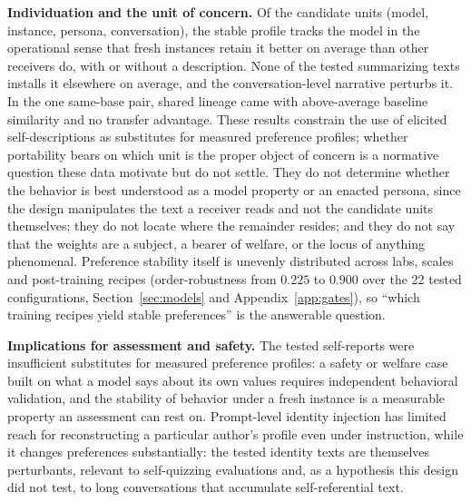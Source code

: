 \documentclass[11pt]{article}
\begin{document}
\textbf{Individuation and the unit of concern.} Of the candidate units (model,
instance, persona, conversation), the stable profile tracks the model in the
operational sense that fresh instances retain it better on average than
other receivers do, with or without a description. None of the tested
summarizing texts installs it elsewhere on average, and the
conversation-level narrative perturbs it. In the one same-base pair, shared
lineage came with above-average baseline similarity and no transfer
advantage. These results constrain the use of elicited
self-descriptions as substitutes for measured preference profiles; whether
portability bears on which unit is the proper object of concern is a
normative question these data motivate but do not settle. They
do not determine whether the behavior is best understood as a model property
or an enacted persona, since the design manipulates the text a receiver
reads and not the candidate units themselves; they do not locate where the
remainder resides; and they do not say that the weights are a subject, a
bearer of welfare, or the locus of anything phenomenal. Preference stability
itself is unevenly distributed across labs, scales and post-training
recipes (order-robustness from $0.225$ to $0.900$ over the 22 tested
configurations, Section~\ref{sec:models} and Appendix~\ref{app:gates}), so
``which training recipes yield stable preferences'' is the
answerable question.

\textbf{Implications for assessment and safety.} The tested self-reports
were insufficient substitutes for measured preference profiles: a safety or welfare case built on what a model
says about its own values requires independent behavioral validation, and
the stability of behavior under a fresh instance is a
measurable property an assessment can rest on. Prompt-level identity
injection has limited reach for reconstructing a particular author's
profile even under instruction, while it changes preferences substantially:
the tested identity texts are themselves perturbants, relevant to
self-quizzing evaluations and, as a hypothesis this design did not test, to
long conversations that accumulate self-referential text.
\end{document}
